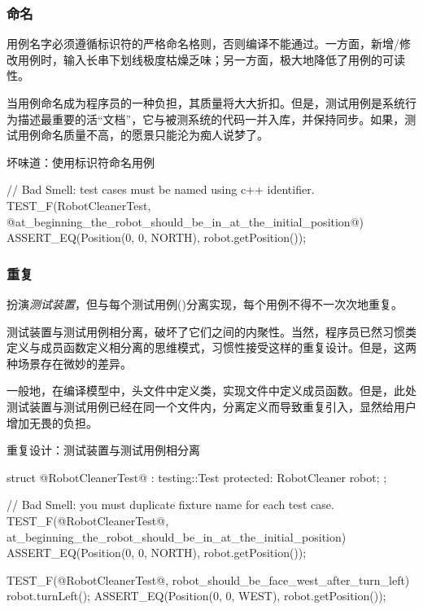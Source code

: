 \begin{content}
\subsubsection{命名}

用例名字必须遵循标识符的严格命名格则，否则编译不能通过。一方面，新增/修改用例时，输入长串下划线极度枯燥乏味；另一方面，极大地降低了用例的可读性。

当用例命名成为程序员的一种负担，其质量将大大折扣。但是，测试用例是系统行为描述最重要的活“文档”，它与被测系统的代码一并入库，并保持同步。如果，测试用例命名质量不高，的愿景只能沦为痴人说梦了。

\begin{nodiff}{坏味道：使用标识符命名用例}
 \begin{c++}
// Bad Smell: test cases must be named using c++ identifier.
TEST_F(RobotCleanerTest, @at_beginning_the_robot_should_be_in_at_the_initial_position@) {
  ASSERT_EQ(Position(0, 0, NORTH), robot.getPosition());
}
 \end{c++}
\end{nodiff}

\subsubsection{重复}

扮演\emph{测试装置}，但与每个测试用例()分离实现，每个用例不得不一次次地重复。

测试装置与测试用例相分离，破坏了它们之间的内聚性。当然，程序员已然习惯类定义与成员函数定义相分离的思维模式，习惯性接受这样的重复设计。但是，这两种场景存在微妙的差异。

一般地，在\cpp{}编译模型中，头文件中定义类，实现文件中定义成员函数。但是，此处测试装置与测试用例已经在同一个文件内，分离定义而导致重复引入，显然给用户增加无畏的负担。

\begin{nodiff}{重复设计：测试装置与测试用例相分离}
 \begin{c++}
struct @RobotCleanerTest@ : testing::Test {
protected:
  RobotCleaner robot;
};
 
// Bad Smell: you must duplicate fixture name for each test case.
TEST_F(@RobotCleanerTest@, at_beginning_the_robot_should_be_in_at_the_initial_position) {
  ASSERT_EQ(Position(0, 0, NORTH), robot.getPosition());
}
 
TEST_F(@RobotCleanerTest@, robot_should_be_face_west_after_turn_left) {
  robot.turnLeft();
  ASSERT_EQ(Position(0, 0, WEST), robot.getPosition());
}
  \end{c++}
\end{nodiff}


\end{content}
